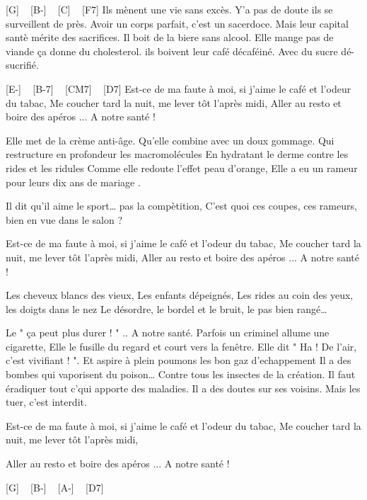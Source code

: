[G] ~ [B-] ~ [C] ~ [F7]
Ils mènent une vie sans excès.
Y'a pas de doute ils se surveillent de près.
Avoir un corps parfait, c'est un sacerdoce.
Mais leur capital santè mérite des sacrifices.
Il boit de la biere sans alcool.
Elle mange pas de viande ça donne du cholesterol.
ils boivent leur café décaféiné.
Avec du sucre dé-sucrifié.

[E-] ~ [B-7] ~ [CM7] ~ [D7]
Est-ce de ma faute à moi, si j'aime le café et l'odeur du tabac,
Me coucher tard la nuit, me lever tôt l'après midi,
Aller au resto et boire des apéros
... A notre santé !

Elle met de la crème anti-âge.
Qu'elle combine avec un doux gommage.
Qui restructure en profondeur les macromolécules
En hydratant le derme contre les rides et les ridules
Comme elle redoute l'effet peau d'orange,
Elle a eu un rameur pour leurs dix ans de mariage .

Il dit qu'il aime le sport… pas la compètition,
C'est quoi ces coupes, ces rameurs, bien en vue dans le salon ?

Est-ce de ma faute à moi, si j'aime le café et l'odeur du tabac,
Me coucher tard la nuit, me lever tôt l'après midi,
Aller au resto et boire des apéros
... A notre santé !

Les cheveux blancs des vieux, Les enfants dépeignés,
Les rides au coin des yeux, les doigts dans le nez
Le désordre, le bordel et le bruit, le pas bien rangé…

Le " ça peut plus durer ! "
.. A notre santé.
Parfois un criminel allume une cigarette,
Elle le fusille du regard et court vers la fenêtre.
Elle dit " Ha ! De l'air, c'est vivifiant ! ".
Et aspire à plein poumons les bon gaz d'echappement
Il a des bombes qui vaporisent du poison…
Contre tous les insectes de la création.
Il faut éradiquer tout c'qui apporte des maladies.
Il a des doutes sur ses voisins. Mais les tuer, c'est interdit.

Est-ce de ma faute à moi, si j'aime le café et l'odeur du tabac,
Me coucher tard la nuit, me lever tôt l'après midi,

Aller au resto et boire des apéros
... A notre santé ! 

[G] ~ [B-] ~ [A-] ~ [D7]